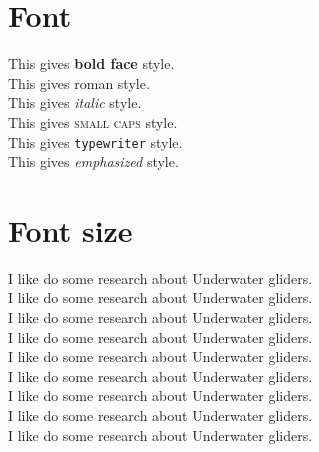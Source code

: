 \documentclass[12pt]{article}
\begin{document}
\section{Font}
This gives \textbf{bold face} style.\\
This gives \textrm{roman} style.\\
This gives \textit{italic} style.\\
This gives \textsc{small caps} style.\\
This gives \texttt{typewriter} style.\\
This gives \emph{emphasized} style.

\section{Font size}
I like do {\tiny some research} about Underwater gliders.\\
I like do {\scriptsize some research} about Underwater gliders.\\
I like do {\footnotesize some research} about Underwater gliders.\\
I like do {\normalsize some research} about Underwater gliders.\\
I like do {\large some research} about Underwater gliders.\\
I like do {\Large some research} about Underwater gliders.\\
I like do {\LARGE some research} about Underwater gliders.\\
I like do {\huge some research} about Underwater gliders.\\
I like do {\Huge some research} about Underwater gliders.
\end{document}
